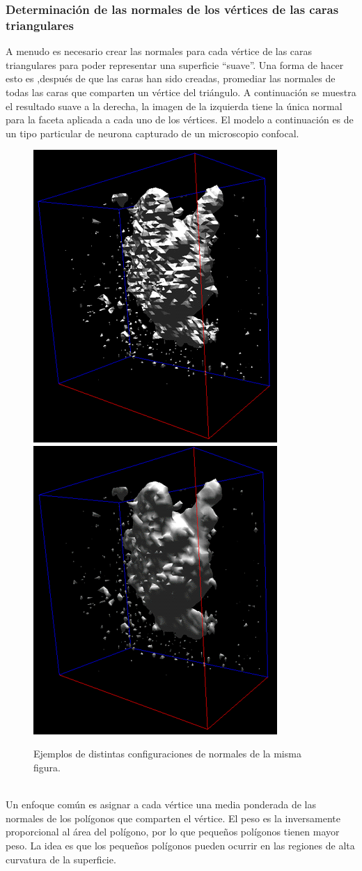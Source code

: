 \documentclass[12pt]{article}
\begin{document}
\subsubsection{Determinación de las normales de los vértices de las caras triangulares}
A menudo es necesario crear las normales para cada vértice de las caras triangulares para poder representar una superficie “suave”. Una forma de hacer esto es ,después de que las caras han sido creadas, promediar las normales de todas las caras que comparten un vértice del triángulo. A continuación se muestra el resultado suave a la derecha, la imagen de la izquierda tiene la única normal para la faceta aplicada a cada uno de los vértices. El modelo a continuación es de un tipo particular de neurona capturado de un microscopio confocal.\\
\begin{figure}[h]
\includegraphics[width =0.45\linewidth]{marchingcubes5.png}
\hfill
\includegraphics[width =0.45\linewidth]{marchingcubes6.png}
\caption{ Ejemplos de distintas configuraciones de normales de la misma figura.}
\label{ fig : surface }
\end{figure}
\\Un enfoque común es asignar a cada vértice una media ponderada de las normales de los polígonos que comparten el vértice. El peso es la inversamente proporcional al área del polígono, por lo que pequeños polígonos tienen mayor peso. La idea es que los pequeños polígonos pueden ocurrir en las regiones de alta curvatura de la superficie.
\end{document}
